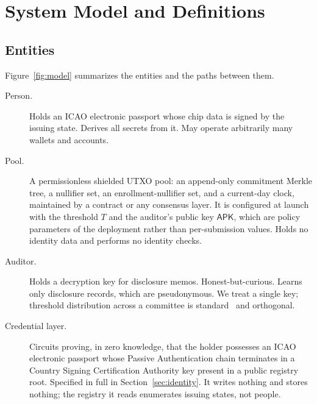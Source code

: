 \documentclass[11pt,a4paper]{article}
\theoremstyle{definition}
\theoremstyle{plain}
\theoremstyle{remark}
\begin{document}
\section{System Model and Definitions}
\label{sec:model}

\subsection{Entities}

Figure~\ref{fig:model} summarizes the entities and the paths between them.

\begin{description}
\item[Person.] Holds an ICAO electronic passport whose chip data is signed by the issuing state. Derives all secrets from it. May operate arbitrarily many wallets and accounts.
\item[Pool.] A permissionless shielded UTXO pool: an append-only commitment Merkle tree, a nullifier set, an enrollment-nullifier set, and a current-day clock, maintained by a contract or any consensus layer. It is configured at launch with the threshold $T$ and the auditor's public key $\mathsf{APK}$, which are policy parameters of the deployment rather than per-submission values. Holds no identity data and performs no identity checks.
\item[Auditor.] Holds a decryption key for disclosure memos. Honest-but-curious. Learns only disclosure records, which are pseudonymous. We treat a single key; threshold distribution across a committee is standard~\cite{dart,utt} and orthogonal.
\item[Credential layer.] Circuits proving, in zero knowledge, that the holder possesses an ICAO electronic passport whose Passive Authentication chain terminates in a Country Signing Certification Authority key present in a public registry root. Specified in full in Section~\ref{sec:identity}. It writes nothing and stores nothing; the registry it reads enumerates issuing states, not people.
\end{description}
\end{document}
